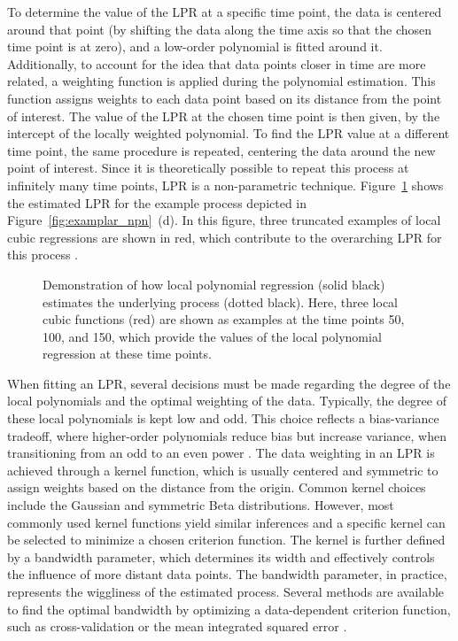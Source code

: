 \documentclass[man, floatsintext]{apa7}
\begin{document}
To determine the value of the LPR at a specific time point, the data is
centered around that point (by shifting the data along the time axis so
that the chosen time point is at zero), and a low-order polynomial is fitted
around it. Additionally, to account for the idea that data points closer in
time are more related, a weighting function is applied during the polynomial
estimation. This function assigns weights to each data point based on its
distance from the point of interest. The value of the LPR at the chosen
time point is then given, by the intercept of the locally weighted polynomial.
To find the LPR value at a different time
point, the same procedure is repeated, centering the data around the new point
of interest. Since it is theoretically possible to repeat this process at
infinitely many
time points, LPR is a non-parametric technique. Figure~\ref{fig:locpol_dem}
shows the estimated LPR for the example process depicted in
Figure~\ref{fig:examplar_npn}~(d).  In this figure, three truncated examples of
local cubic regressions are shown
in red, which contribute to the overarching LPR for this process .\@

\begin{figure}[!ht]
  \caption{Demonstration of how local polynomial regression (solid black)
    estimates the underlying process (dotted black). Here, three local cubic
    functions (red) are shown as examples at the time points 50, 100, and 150,
    which provide the values of the local polynomial regression at these time
    points.}
  \label{fig:locpol_dem}
\end{figure}

When fitting an LPR, several decisions must be
made regarding the degree of the local polynomials and the optimal weighting of
the data. Typically, the degree of these local polynomials is kept low and odd.
This choice reflects a bias-variance tradeoff, where higher-order polynomials
reduce bias but increase variance, when transitioning from an odd
to an even power \parencite{ruppert_multivariate_1994}. The data weighting
in an LPR is achieved through a
kernel function, which is usually centered and symmetric to assign weights
based
on the distance from the origin. Common kernel choices include the Gaussian and
symmetric Beta distributions. However, most commonly used kernel functions
yield similar
inferences and a specific kernel can be selected to minimize a chosen criterion
function. The kernel is further defined by a bandwidth
parameter, which determines its width and effectively controls the influence of
more distant data points. The bandwidth parameter, in practice, represents the
wiggliness of the estimated process.
Several methods are available to find the optimal bandwidth by optimizing a
data-dependent criterion function, such as cross-validation or the mean
integrated squared error \parencite{kohler_review_2014, debruyne_model_2008}.
\end{document}
